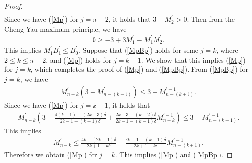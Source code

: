 \documentclass[10pt,a4paper]{amsart}
\begin{document}
\begin{proof}
\begin{align*}
\end{align*}
Since we have (\ref{Mp}) for $j=n-2$, it holds that $3-M_2^\prime>0$. Then from the Cheng-Yau maximum principle, we have
\begin{align*}
0\geq -3+3M_1^\prime -M_1^\prime M_2^\prime.
\end{align*}
This implies $M_1^\prime B_1^\prime\leq B_0^\prime$. Suppose that (\ref{MpBp}) holds for some $j=k$, where $2\leq k\leq n-2$, and (\ref{Mp}) holds for $j=k-1$. We show that this implies (\ref{Mp}) for $j=k$, which completes the proof of (\ref{Mp}) and (\ref{MpBp}). From (\ref{MpBp}) for $j=k$, we have
\begin{align*}
M_{n-k}^\prime(3-M_{n-(k-1)}^\prime)\leq {3-M_{n-(k+1)}^{\prime-1}}.
\end{align*}
Since we have (\ref{Mp}) for $j=k-1$, it holds that
\begin{align*}
M_{n-k}^\prime\left(3-\frac{4(k-1)-(2k-3)\delta}{2k-1-(k-1)\delta}+\frac{2k-3-(k-2)\delta}{2k-1-(k-1)\delta}M_{n-k}^{\prime-1}\right)\leq {3-M_{n-(k+1)}^{\prime-1}}.
\end{align*}
This implies
\begin{align*}
M_{n-k}^\prime \leq \frac{4k-(2k-1)\delta}{2k+1-k\delta}-\frac{2k-1-(k-1)\delta}{2k+1-k\delta}M_{n-(k+1)}^{\prime-1}.
\end{align*}
Therefore we obtain (\ref{Mp}) for $j=k$. This implies (\ref{Mp}) and (\ref{MpBp}). 
\end{proof}
\end{document}
